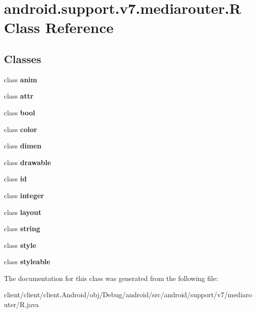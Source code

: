 \hypertarget{classandroid_1_1support_1_1v7_1_1mediarouter_1_1R}{}\section{android.\+support.\+v7.\+mediarouter.\+R Class Reference}
\label{classandroid_1_1support_1_1v7_1_1mediarouter_1_1R}
\subsection*{Classes}
\begin{DoxyCompactItemize}
\item 
class {\bfseries anim}
\item 
class {\bfseries attr}
\item 
class {\bfseries bool}
\item 
class {\bfseries color}
\item 
class {\bfseries dimen}
\item 
class {\bfseries drawable}
\item 
class {\bfseries id}
\item 
class {\bfseries integer}
\item 
class {\bfseries layout}
\item 
class {\bfseries string}
\item 
class {\bfseries style}
\item 
class {\bfseries styleable}
\end{DoxyCompactItemize}


The documentation for this class was generated from the following file\+:\begin{DoxyCompactItemize}
\item 
client/client/client.\+Android/obj/\+Debug/android/src/android/support/v7/mediarouter/R.\+java\end{DoxyCompactItemize}
